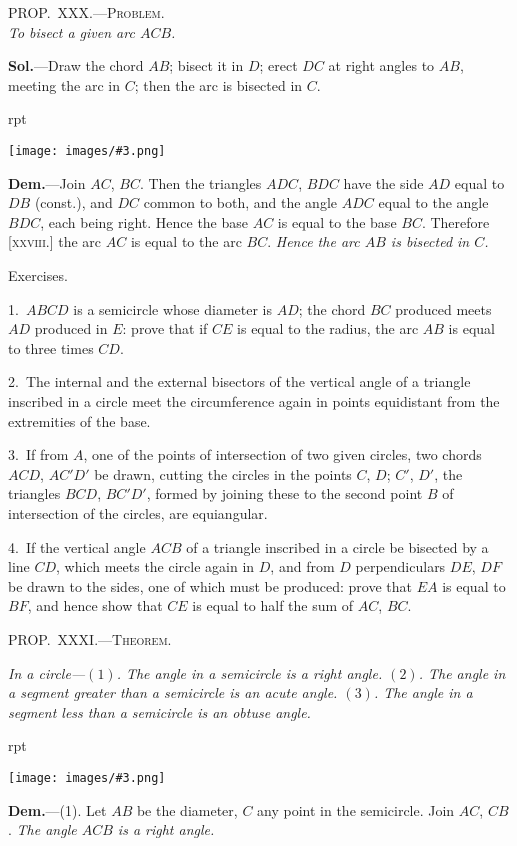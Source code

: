 \documentclass[oneside]{book}
\newcounter{wrapwidth}
\newcommand\myprop[2]{
\bigskip\Needspace*{4\baselineskip}\begin{center}\textsc{#1}\\\medskip\emph{#2}\par\end{center}
}
\newcommand\mypropl[2]{
\bigskip\Needspace*{4\baselineskip}\begin{center}\textsc{#1}\end{center}
\hspace{\parindent}\emph{#2}\par\medskip
}
\newcommand\exhead[1]{
\Needspace*{5\baselineskip}\begin{center}
\textsf{#1}
\end{center}
}
\newcommand\imgflow[3]{
\setcounter{wrapwidth}{#1}
\begin{wrapfigure}[#2]{r}{\value{wrapwidth}pt}
\begin{center}
\vspace{-0.3in}
\texttt{[image: images/\#3.png]}
\end{center}
\end{wrapfigure}
}
\begin{document}
\myprop{PROP\@.~XXX\@.---Problem.}{To bisect a given arc $ACB$.}

\textbf{Sol.}---Draw the chord $AB$; bisect it in $D$; erect $DC$
at right angles to $AB$, meeting the arc in $C$; then the
arc is bisected in $C$.

\imgflow{120}{6}{f136}

\textbf{Dem.}---Join $AC$, $BC$. Then
the triangles $ADC$, $BDC$ have
the side $AD$ equal to $DB$ (const.),
and $DC$ common to both, and
the angle $ADC$ equal to the
angle $BDC$, each being right. Hence the base $AC$ is
equal to the base $BC$. Therefore [\textsc{xxviii.}] the arc $AC$
is equal to the arc $BC$. \emph{Hence the arc $AB$ is bisected
in $C$.}

\exhead{Exercises.}

\begin{footnotesize}
1.~$ABCD$ is a semicircle whose diameter is $AD$; the chord $BC$
produced meets $AD$ produced in $E$: prove that if $CE$ is equal to
the radius, the arc $AB$ is equal to three times $CD$.

2.~The internal and the external bisectors of the vertical angle
of a triangle inscribed in a circle meet the circumference again in
points equidistant from the extremities of the base.

3.~If from $A$, one of the points of intersection of two given
circles, two chords $ACD$, $AC'D'$ be drawn, cutting the circles in
the points $C$, $D$; $C'$, $D'$, the triangles $BCD$, $BC'D'$, formed by
joining these to the second point $B$ of intersection of the circles,
are equiangular.

4.~If the vertical angle $ACB$ of a triangle inscribed in a circle
be bisected by a line $CD$, which meets the circle again in $D$, and
from $D$ perpendiculars $DE$, $DF$ be drawn to the sides, one of
which must be produced: prove that $EA$ is equal to $BF$, and
hence show that $CE$ is equal to half the sum of $AC$, $BC$.
\par\end{footnotesize}


\mypropl{PROP\@.~XXXI\@.---Theorem.}{In a circle---$(1)$. The angle in a semicircle is a right
angle. $(2)$. The angle in a segment greater than a semicircle
is an acute angle. $(3)$. The angle in a segment less
than a semicircle is an obtuse angle.}

\imgflow{140}{13}{f137}

\textbf{Dem.}---(1). Let $AB$ be the diameter, $C$ any point in
the semicircle. Join $AC$, $CB$.
\textit{The angle $ACB$ is a right angle.}
\end{document}
